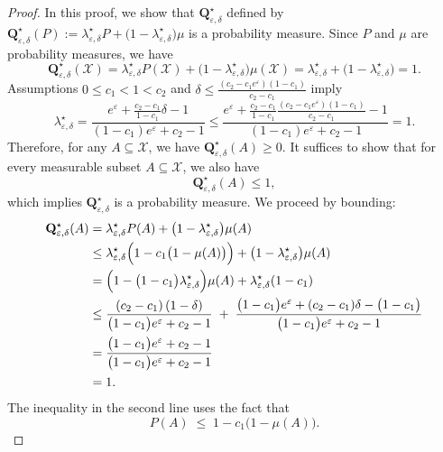 \documentclass[accepted]{article}
\theoremstyle{plain} %
\theoremstyle{definition}
\theoremstyle{remark}
\newcommand{\eps}{\varepsilon}
\newcommand{\bQ}{\mathbf{Q}}
\newcommand{\X}{\mathcal{X}}
\begin{document}
\begin{proof}
    In this proof, we show that $\bQ^\star_{\varepsilon, \delta}$  defined by $
\bQ^\star_{\varepsilon, \delta}(P) 
:= \lambda^\star_{\varepsilon, \delta} P + \bigl(1 - \lambda^\star_{\varepsilon, \delta}\bigr) \mu
$ is a probability measure.
Since $P$ and $\mu$ are probability measures, we have
\[
\bQ^\star_{\varepsilon, \delta}(\mathcal{X})
= \lambda^\star_{\varepsilon, \delta} P(\mathcal{X}) 
+ \bigl(1 - \lambda^\star_{\varepsilon, \delta}\bigr)\mu(\mathcal{X})
= \lambda^\star_{\varepsilon, \delta} + \bigl(1 - \lambda^\star_{\varepsilon, \delta}\bigr)
= 1.
\]
Assumptions $0\leq c_1 < 1 < c_2$ and $\delta \leq \frac{(c_2-c_1e^\eps)(1-c_1)}{c_2-c_1}$ imply
\[\lambda^\star_{\varepsilon, \delta} 
    = \frac{e^{\varepsilon} + \frac{c_2 - c_1}{1 - c_1} \delta - 1}
           {(1 - c_1) e^{\varepsilon} + c_2 - 1} \leq \frac{e^{\varepsilon} + \frac{c_2 - c_1}{1 - c_1} \frac{(c_2-c_1e^\eps)(1-c_1)}{c_2-c_1} - 1}
           {(1 - c_1) e^{\varepsilon} + c_2 - 1} = 1.\]
Therefore, for any $A \subseteq \X$, we have $\bQ^\star_{\varepsilon, \delta}(A) \geq 0$. It suffices to show that for every measurable subset $A \subseteq \mathcal{X}$, we also have
\[
\bQ^\star_{\varepsilon, \delta}(A) \le 1,
\]
which implies $\bQ^\star_{\varepsilon, \delta}$ is a probability measure. We proceed by bounding:
\begin{align*}
\bQ^\star_{\varepsilon, \delta}(A) 
& = \lambda^\star_{\varepsilon, \delta} P(A) 
  + \bigl(1 - \lambda^\star_{\varepsilon, \delta}\bigr)\mu(A) \\
& \le \lambda^\star_{\varepsilon, \delta} 
  \Bigl(1 - c_1\bigl(1 - \mu(A)\bigr)\Bigr)
  + \bigl(1 - \lambda^\star_{\varepsilon, \delta}\bigr)\mu(A) \\
& = \Bigl(1 - \bigl(1 - c_1\bigr)\lambda^\star_{\varepsilon, \delta}\Bigr)\mu(A)
  + \lambda^\star_{\varepsilon, \delta}(1 - c_1) \\
& \le \frac{(c_2 - c_1)\,(1 - \delta)}{\bigl(1 - c_1\bigr)e^{\varepsilon} + c_2 - 1}
  \;+\; \frac{\bigl(1 - c_1\bigr)e^{\varepsilon} + (c_2 - c_1)\delta 
  - \bigl(1 - c_1\bigr)}{\bigl(1 - c_1\bigr)e^{\varepsilon} + c_2 - 1} \\
& = \frac{\bigl(1 - c_1\bigr)e^{\varepsilon} + c_2 - 1}
  {\bigl(1 - c_1\bigr)e^{\varepsilon} + c_2 - 1} \\
& = 1.
\end{align*}
The inequality in the second line uses the fact that
\[
P(A) 
\;\le\; 1 - c_1\bigl(1 - \mu(A)\bigr).
\]
\end{proof}
\end{document}
